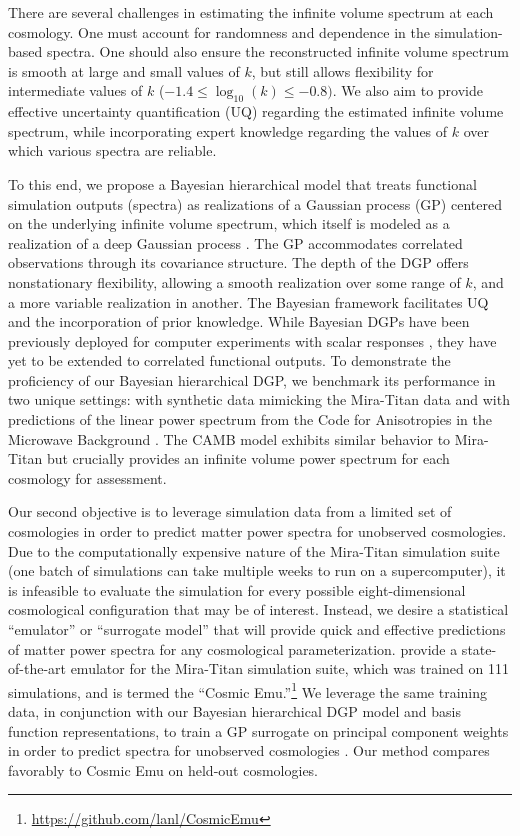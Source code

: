 \documentclass[11pt]{article}
\begin{document}
There are several challenges in estimating the infinite volume spectrum at each cosmology. 
One must account for randomness and dependence in the simulation-based spectra. 
One should also ensure the reconstructed infinite volume spectrum is smooth at large and 
small values of $k$, but still allows flexibility for intermediate values of $k$ 
($-1.4 \leq \log_{10}(k) \leq -0.8)$. We also aim to provide effective uncertainty 
quantification (UQ) regarding the estimated infinite volume spectrum, while incorporating 
expert knowledge regarding the values of $k$ over which various spectra are reliable.

To this end, we propose a Bayesian hierarchical model that treats functional simulation 
outputs (spectra) as realizations of a Gaussian process (GP) centered on the underlying 
infinite volume spectrum, which itself is modeled as a realization of a deep Gaussian process 
\citep[DGP;][]{damianou2013deep}.  The GP accommodates correlated observations
through its covariance structure.  The depth of the DGP offers nonstationary flexibility, 
allowing a smooth realization over some range of $k$, and a more variable realization in 
another.  The Bayesian framework facilitates UQ and the incorporation of prior
knowledge.  While Bayesian DGPs have been previously deployed for computer experiments 
with scalar responses \citep[e.g.,][]{sauer2023active,sauer2023vecchia,ming2023deep}, 
they have yet to be extended to correlated functional outputs. 
To demonstrate the proficiency of our Bayesian hierarchical DGP, 
we benchmark its performance in two unique settings: with synthetic data 
mimicking the Mira-Titan data and with predictions of the linear power spectrum from 
the Code for Anisotropies in the Microwave Background \citep[CAMB;][]{lewis2011CAMB}.
The CAMB model exhibits similar behavior to Mira-Titan but crucially
provides an infinite volume power spectrum for each cosmology for assessment.

Our second objective is to leverage simulation data from a limited set of
cosmologies in order to predict matter power spectra for unobserved cosmologies.
Due to the computationally expensive nature of the Mira-Titan simulation suite
(one batch of simulations can take multiple weeks to run on a supercomputer),
it is infeasible to evaluate the simulation for every possible eight-dimensional
cosmological configuration that may be of interest.  Instead, we desire
a statistical ``emulator'' or ``surrogate model'' 
\citep{santner2003design,gramacy2020surrogates} that will provide quick and effective
predictions of matter power spectra for any cosmological parameterization.
\citet{moran2023mira} provide a state-of-the-art emulator for the Mira-Titan
simulation suite, which was trained on 111 simulations, and is termed 
the ``Cosmic Emu.''\footnote{\url{https://github.com/lanl/CosmicEmu}}
We leverage the same training data, in conjunction with our Bayesian hierarchical
DGP model and basis function representations, to train a GP surrogate 
on principal component weights in order to predict spectra for unobserved
cosmologies \citep{higdon2008computer, higdon2010estcosmo}. 
Our method compares favorably to Cosmic Emu on held-out cosmologies.
\end{document}
